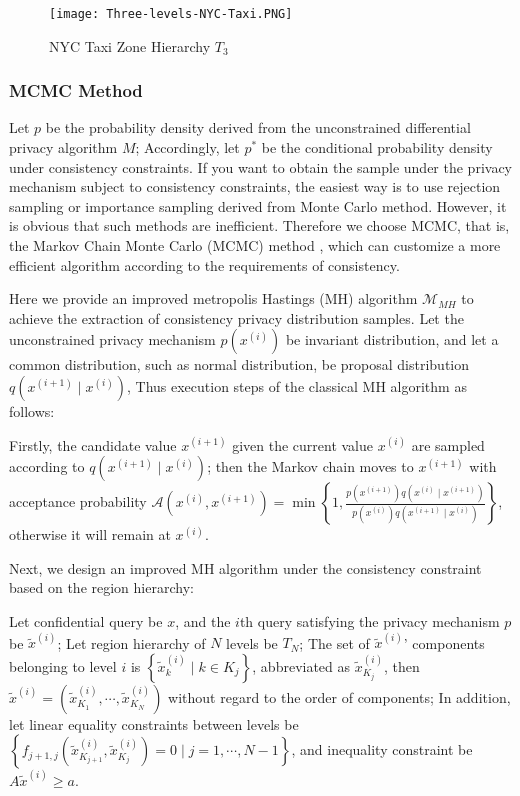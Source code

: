 \documentclass[11pt]{article}
\begin{document}
\begin{figure}[htbp]
\centering
\texttt{[image: Three-levels-NYC-Taxi.PNG]}
\caption{NYC Taxi Zone Hierarchy $T_{3}$}
\label{fig:1}
\end{figure}


\subsubsection{MCMC Method}

Let $p$ be the probability density derived from the unconstrained differential privacy algorithm $M$; Accordingly, let $p^{*}$ be the conditional probability density under consistency constraints. If you want to obtain the sample under the privacy mechanism subject to consistency constraints, the easiest way is to use rejection sampling or importance sampling derived from Monte Carlo method. However, it is obvious that such methods are inefficient. Therefore we choose MCMC, that is, the Markov Chain Monte Carlo (MCMC) method \cite{Andrieu2003introduction,Hastings1970monte,Mengersen1996rates,Metropolis1949monte}, which can customize a more efficient algorithm according to the requirements of consistency.

Here we provide an improved metropolis Hastings (MH) algorithm $\mathcal{M}_{M H}$ to achieve the extraction of consistency privacy distribution samples. Let the unconstrained privacy mechanism $p\left(x^{(i)}\right)$ be invariant distribution, and let a common distribution, such as normal distribution, be proposal distribution $q\left(x^{(i+1)} \mid x^{(i)}\right)$, Thus execution steps of the classical MH algorithm as follows:

Firstly, the candidate value $x^{(i+1)}$ given the current value $x^{(i)}$ are sampled according to $q\left(x^{(i+1)} \mid x^{(i)}\right)$; then the Markov chain moves to $x^{(i+1)}$ with acceptance probability $\mathcal{A}\left(x^{(i)}, x^{(i+1)}\right)=\min \left\{1, \frac{p\left(x^{(i+1)}\right) q\left(x^{(i)} \mid x^{(i+1)}\right)}{p\left(x^{(i)}\right) q\left(x^{(i+1)} \mid x^{(i)}\right)}\right\}$, otherwise it will remain at $x^{(i)}$.

Next, we design an improved MH algorithm under the consistency constraint based on the region hierarchy:

Let confidential query be $x$, and the $i$th query satisfying the privacy mechanism $p$ be $\tilde{x}^{(i)}$; Let region hierarchy of $N$ levels be $T_{N}$; The set of $\tilde{x}^{(i)}$' components belonging to level $i$ is $\left\{\tilde{x}_{k}^{(i)} \mid k \in K_{j}\right\}$, abbreviated as $\tilde{x}_{K_{j}}^{(i)}$, then $\tilde{x}^{(i)}=\left(\tilde{x}_{K_{1}}^{(i)}, \cdots, \tilde{x}_{K_{N}}^{(i)}\right)$ without regard to the order of components; In addition, let linear equality constraints between levels be $\left\{f_{j+1, j}\left(\tilde{x}_{K_{j+1}}^{(i)}, \tilde{x}_{K_{j}}^{(i)}\right)=0 \mid j=1, \cdots, N-1\right\}$, and inequality constraint be $A \tilde{x}^{(i)} \geq a$.
\end{document}
